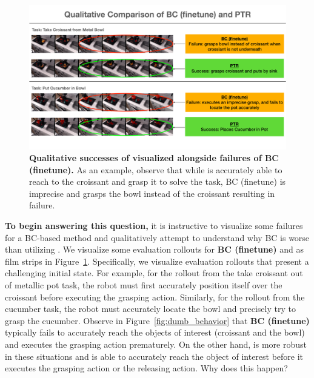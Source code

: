 \documentclass[conference]{IEEEtran}
\begin{document}
\begin{figure}[h]
\centering
\vspace{-0.4cm}
  \includegraphics[width=0.83\linewidth]{Comparison.pdf}
  \vspace{-0.5cm}
  \caption{\footnotesize \textbf{Qualitative successes of \methodname visualized alongside failures of BC (finetune).} As an example, observe that while \methodname is accurately able to reach to the croissant and grasp it to solve the task, BC (finetune) is imprecise and grasps the bowl instead of the croissant resulting in failure.}
  \label{fig:dumb_behavior2}
  \vspace{-0.3cm}
\end{figure}


\textbf{To begin answering this question,} it is instructive to visualize some failures for a BC-based method and qualitatively attempt to understand why BC is worse than utilizing \methodname. We visualize some evaluation rollouts for \textbf{BC (finetune)} and \methodname as film strips in {Figure~\ref{fig:dumb_behavior2}}. Specifically, we visualize evaluation rollouts that present a challenging initial state. For example, for the rollout from the take croissant out of metallic pot task, the robot must first accurately position itself over the croissant before executing the grasping action. Similarly, for the rollout from the cucumber task, the robot must accurately locate the bowl and precisely try to grasp the cucumber. Observe in {Figure~\ref{fig:dumb_behavior}} that \textbf{BC (finetune)} typically fails to accurately reach the objects of interest (croissant and the bowl) and executes the grasping action prematurely. On the other hand, \methodname is more robust in these situations and is able to accurately reach the object of interest before it executes the grasping action or the releasing action. Why does this happen?  
\end{document}
